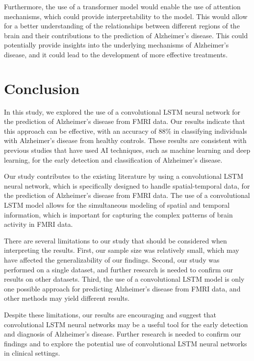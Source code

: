 \documentclass[10pt]{article}
\begin{document}
	Furthermore, the use of a transformer model would enable the use of attention mechanisms, which could provide interpretability to the model. This would allow for a better understanding of the relationships between different regions of the brain and their contributions to the prediction of Alzheimer's disease. This could potentially provide insights into the underlying mechanisms of Alzheimer's disease, and it could lead to the development of more effective treatments.

	\section{Conclusion}

	In this study, we explored the use of a convolutional LSTM neural network for the prediction of Alzheimer's disease from FMRI data. Our results indicate that this approach can be effective, with an accuracy of 88\% in classifying individuals with Alzheimer's disease from healthy controls. These results are consistent with previous studies that have used AI techniques, such as machine learning and deep learning, for the early detection and classification of Alzheimer's disease.

	Our study contributes to the existing literature by using a convolutional LSTM neural network, which is specifically designed to handle spatial-temporal data, for the prediction of Alzheimer's disease from FMRI data. The use of a convolutional LSTM model allows for the simultaneous modeling of spatial and temporal information, which is important for capturing the complex patterns of brain activity in FMRI data.

	There are several limitations to our study that should be considered when interpreting the results. First, our sample size was relatively small, which may have affected the generalizability of our findings. Second, our study was performed on a single dataset, and further research is needed to confirm our results on other datasets. Third, the use of a convolutional LSTM model is only one possible approach for predicting Alzheimer's disease from FMRI data, and other methods may yield different results.

	Despite these limitations, our results are encouraging and suggest that convolutional LSTM neural networks may be a useful tool for the early detection and diagnosis of Alzheimer's disease. Further research is needed to confirm our findings and to explore the potential use of convolutional LSTM neural networks in clinical settings.
\end{document}
